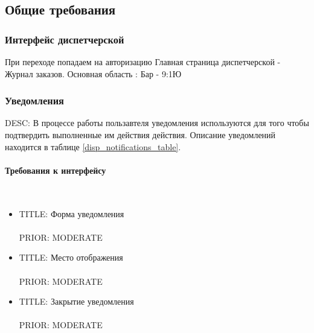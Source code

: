 \subsection{Общие требования}

	\subsubsection{Интерфейс диспетчерской}

		При переходе попадаем на авторизацию
		Главная страница диспетчерской - Журнал заказов. Основная область : Бар - 9:1Ю 





	\subsubsection{Уведомления}

		DESC: В процессе работы пользавтеля уведомления используются для того чтобы подтвердить выполненные им действия действия. Описание уведомлений находится в таблице \ref{disp_notifications_table}.

		\paragraph{Требования к интерфейсу} \mbox{}\\

			\begin{itemize}

				\item {
					TITLE: Форма уведомления\\
					\\
					PRIOR: MODERATE\\}

				\item {
					TITLE: Место отображения\\
					\\
					PRIOR: MODERATE\\}

				\item {
					TITLE: Закрытие уведомления\\
					\\
					PRIOR: MODERATE\\}

			\end{itemize}

